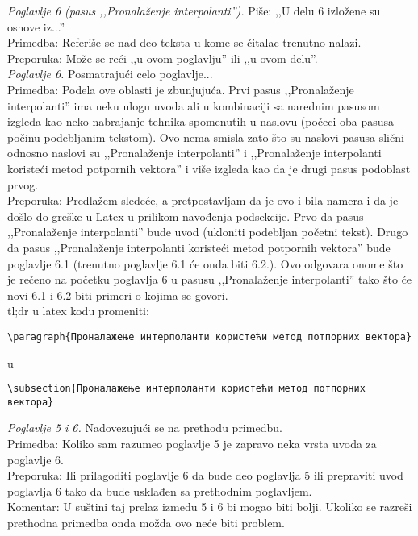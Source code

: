 \documentclass[a4paper]{report}
\begin{document}
\textit{Poglavlje 6 (pasus ,,Pronalaženje interpolanti'').} Piše: ,,U delu 6 izložene su osnove iz...'' \\
\indent Primedba: Referiše se nad deo teksta u kome se čitalac trenutno nalazi. \\
\indent Preporuka: Može se reći ,,u ovom poglavlju'' ili ,,u ovom delu''. \\

\textit{Poglavlje 6.} Posmatrajući celo poglavlje... \\
\indent Primedba: Podela ove oblasti je zbunjujuća. Prvi pasus ,,Pronalaženje interpolanti'' ima neku ulogu uvoda ali u kombinaciji sa narednim pasusom izgleda kao neko nabrajanje tehnika spomenutih u naslovu (počeci oba pasusa počinu podebljanim tekstom). Ovo nema smisla zato što su naslovi pasusa slični odnosno naslovi su ,,Pronalaženje interpolanti'' i  ,,Pronalaženje interpolanti koristeći metod potpornih vektora'' i više izgleda kao da je drugi pasus podoblast prvog. \\
\indent Preporuka: Predlažem sledeće, a pretpostavljam da je ovo i bila namera i da je došlo do greške u Latex-u prilikom navođenja podsekcije. Prvo da pasus ,,Pronalaženje interpolanti'' bude uvod (ukloniti podebljan početni tekst). Drugo da pasus ,,Pronalaženje interpolanti koristeći metod potpornih vektora'' bude poglavlje 6.1 (trenutno poglavlje 6.1 će onda biti 6.2.). Ovo odgovara onome što je rečeno na početku poglavlja 6 u pasusu ,,Pronalaženje interpolanti'' tako što će novi 6.1 i 6.2 biti primeri o kojima se govori. \\
tl;dr u latex kodu promeniti:
\begin{verbatim}
\paragraph{Проналажење интерполанти користећи метод потпорних вектора}
\end{verbatim}
u
\begin{verbatim}
\subsection{Проналажење интерполанти користећи метод потпорних вектора}
\end{verbatim}

\textit{Poglavlje 5 i 6.} Nadovezujući se na prethodu primedbu. \\
\indent Primedba: Koliko sam razumeo poglavlje 5 je zapravo neka vrsta uvoda za poglavlje 6. \\
\indent Preporuka: Ili prilagoditi poglavlje 6 da bude deo poglavlja 5 ili prepraviti uvod poglavlja 6 tako da bude usklađen sa prethodnim poglavljem. \\
\indent Komentar: U suštini taj prelaz između 5 i 6 bi mogao biti bolji. Ukoliko se razreši prethodna primedba onda možda ovo neće biti problem. \\
\end{document}
